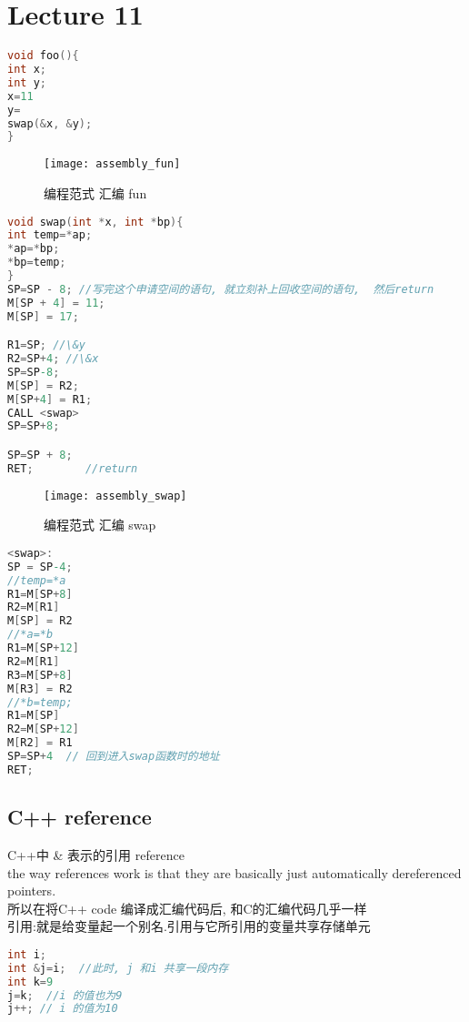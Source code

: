 \documentclass{article}
\begin{document}
\section{Lecture 11}
\begin{lstlisting}[language = C]
void foo(){
int x;
int y;
x=11
y=
swap(&x, &y);
}
\end{lstlisting}
\begin{figure}[htbp]
	\centering
	\texttt{[image: assembly\_fun]}\\
	\caption{编程范式 汇编 fun}\label{fig.assembly.fun}
\end{figure}


\begin{lstlisting}[language = C]
void swap(int *x, int *bp){
int temp=*ap;
*ap=*bp;
*bp=temp;
}
SP=SP - 8; //写完这个申请空间的语句, 就立刻补上回收空间的语句,  然后return
M[SP + 4] = 11;
M[SP] = 17;

R1=SP; //\&y
R2=SP+4; //\&x
SP=SP-8;
M[SP] = R2;
M[SP+4] = R1;
CALL <swap>
SP=SP+8;

SP=SP + 8;
RET;		//return
\end{lstlisting}

\begin{figure}[htbp]
	\centering
	\texttt{[image: assembly\_swap]}\\
	\caption{编程范式 汇编 swap}\label{fig.assembly.swap}
\end{figure}

\begin{lstlisting}[language = C]
<swap>:
SP = SP-4;
//temp=*a
R1=M[SP+8]
R2=M[R1]
M[SP] = R2
//*a=*b
R1=M[SP+12]
R2=M[R1]
R3=M[SP+8]
M[R3] = R2
//*b=temp;
R1=M[SP]
R2=M[SP+12]
M[R2] = R1
SP=SP+4  // 回到进入swap函数时的地址
RET;
\end{lstlisting}

\subsection{C++ reference}
C++中 \& 表示的引用 reference\\
the way references work is that they are basically just automatically dereferenced pointers.\\
所以在将C++ code 编译成汇编代码后, 和C的汇编代码几乎一样\\

引用:就是给变量起一个别名.引用与它所引用的变量共享存储单元
\begin{lstlisting}[language = C]
int i;
int &j=i;  //此时, j 和i 共享一段内存
int k=9
j=k;  //i 的值也为9
j++; // i 的值为10
\end{lstlisting}
\end{document}
